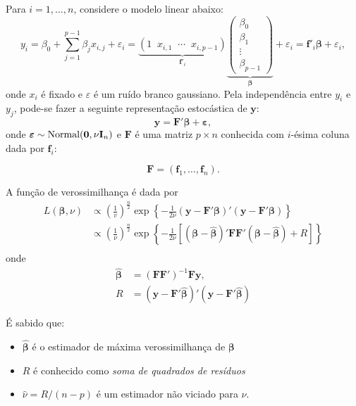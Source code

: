 \documentclass[
  letterpaper,
  DIV=11,
  numbers=noendperiod]{scrartcl}
\theoremstyle{definition}
\theoremstyle{definition}
\theoremstyle{plain}
\theoremstyle{plain}
\theoremstyle{remark}
\begin{document}
Para \(i=1,\ldots,n\), considere o modelo linear abaixo:
\[y_i= \beta_0+\sum_{j=1}^{p-1}\beta_jx_{i,j}+\varepsilon_i=\underbrace{ \left(1\;\;x_{i,1}\;\;\cdots\;\;x_{i,p-1}\right)}_\text{$\boldsymbol{f}'_i$}\underbrace{\left(\begin{array}{c}\beta_0 \\ \beta_1 \\ \vdots \\ \beta_{p-1} 
        \end{array}\right)}_\text{$\boldsymbol{\beta}$}+\varepsilon_i=\boldsymbol{f}'_i\boldsymbol{\beta}+\varepsilon_i,\]
onde \(x_i\) é fixado e \(\varepsilon\) é um ruído branco gaussiano.
Pela independência entre \(y_i\) e \(y_j\), pode-se fazer a seguinte
representação estocástica de \(\boldsymbol{y}\): \begin{equation}
        \boldsymbol{y}=\boldsymbol{F}'\boldsymbol{\beta} + \boldsymbol{\varepsilon},
        \end{equation} onde
\(\boldsymbol{\varepsilon}\sim\hbox{Normal}(\boldsymbol{0},\nu\textbf{I}_n)\)
e \(\boldsymbol{F}\) é uma matriz \(p\times n\) conhecida com
\(i\)-ésima coluna dada por \(\boldsymbol{f}_i\):

\[\boldsymbol{F}=\left(\boldsymbol{f}_1,\ldots,\boldsymbol{f}_n\right).\]

A função de verossimilhança é dada por \begin{align*}
    L(\boldsymbol{\beta},\nu)&\propto \left(\frac{1}{v}\right)^{\frac{n}{2}}\exp\left\{-\frac{1}{2\nu}(\boldsymbol{y}-\boldsymbol{F}'\boldsymbol{\beta})'(\boldsymbol{y}-\boldsymbol{F}'\boldsymbol{\beta}) \right\}\\
    &\propto \left(\frac{1}{\nu}\right)^{\frac{n}{2}}\exp\left\{-\frac{1}{2\nu}\left[(\boldsymbol{\beta}-\hat{\boldsymbol{\beta}})'\boldsymbol{F}\boldsymbol{F}'(\boldsymbol{\beta}-\hat{\boldsymbol{\beta}}) + R\right]\right\}\\
    \end{align*} onde \begin{align}
    \hat{\boldsymbol{\beta}}&=\left(\boldsymbol{F}\boldsymbol{F}'\right)^{-1}\boldsymbol{F}\boldsymbol{y},\\
    R &= \left( \boldsymbol{y}-\boldsymbol{F}' \hat{\boldsymbol{\beta}}\right)' \left( \boldsymbol{y}-\boldsymbol{F}' \hat{\boldsymbol{\beta}}\right)   
    \end{align}

É sabido que:

\begin{itemize}
\item
  \(\hat{\boldsymbol{\beta}}\) é o estimador de máxima verossimilhança
  de \(\boldsymbol{\beta}\)
\item
  \(R\) é conhecido como \emph{soma de quadrados de resíduos}
\item
  \(\hat{\nu}=R/(n-p)\) é um estimador não viciado para \(\nu\).
\end{itemize}
\end{document}
